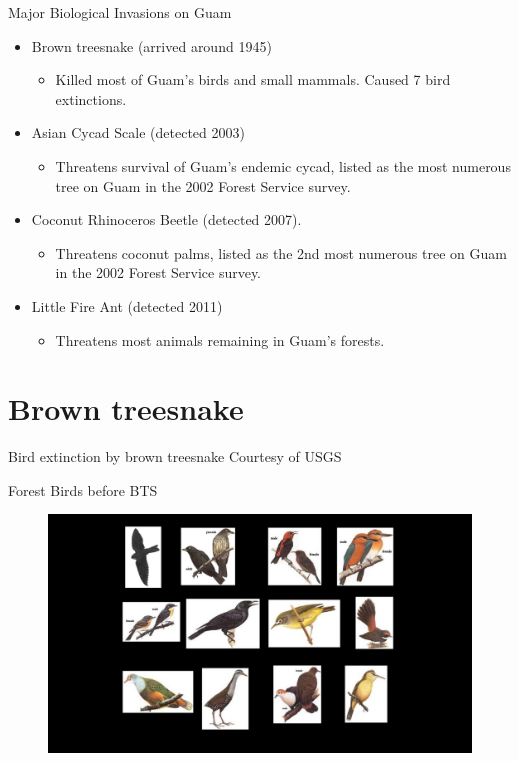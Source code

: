 \documentclass[]{beamer}
\begin{document}
\begin{frame}{Major Biological Invasions on Guam}
	\begin{itemize}
		\item Brown treesnake (arrived around 1945)
			\begin{itemize}
			\item Killed most of Guam's birds and small mammals. Caused 7 bird extinctions.
			\end{itemize}
		\item Asian Cycad Scale (detected 2003)
			\begin{itemize}
				\item Threatens survival of Guam's endemic cycad, listed as the most numerous tree on Guam in the 2002 Forest Service survey.
			\end{itemize}
		\item Coconut Rhinoceros Beetle (detected 2007). 
			\begin{itemize}
			\item Threatens coconut palms, listed as the 2nd most numerous tree on Guam in the 2002 Forest Service survey.
			\end{itemize}
		\item Little Fire Ant (detected 2011)
			\begin{itemize}
		\item Threatens most animals remaining in Guam's forests.
			\end{itemize}
	\end{itemize}		
\end{frame}


\section{Brown treesnake}

\begin{frame}{Bird extinction by brown treesnake}
    \tiny{Courtesy of USGS}
\end{frame}

\begin{frame}{Forest Birds before BTS}
	\begin{figure}
		\includegraphics[height=0.8\textheight]{birds-before-bts.png}
	\end{figure}
\end{frame}
\end{document}
